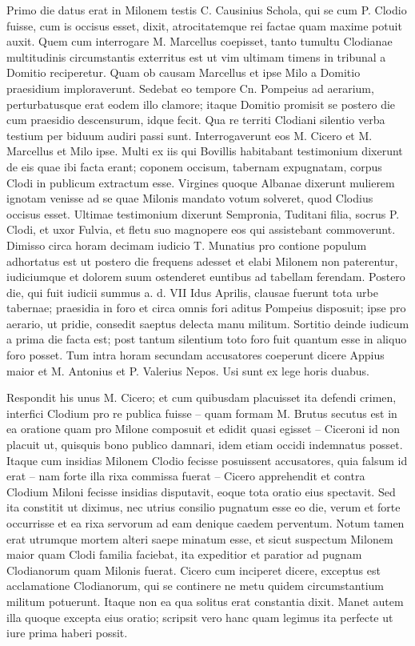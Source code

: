 Primo die datus erat in Milonem testis C. Causinius Schola, qui se cum P. Clodio fuisse, cum is occisus esset, dixit, atrocitatemque rei factae quam maxime potuit auxit. Quem cum interrogare M. Marcellus coepisset, tanto tumultu Clodianae multitudinis circumstantis exterritus est ut vim ultimam timens in tribunal a Domitio reciperetur. Quam ob causam Marcellus et ipse Milo a Domitio praesidium imploraverunt. Sedebat eo tempore Cn. Pompeius ad aerarium, perturbatusque erat eodem illo clamore; itaque Domitio promisit se postero die cum praesidio descensurum, idque fecit. Qua re territi Clodiani silentio verba testium per biduum audiri passi sunt. Interrogaverunt eos M. Cicero et M. Marcellus et Milo ipse. Multi ex iis qui Bovillis habitabant testimonium dixerunt de eis quae ibi facta erant; coponem occisum, tabernam expugnatam, corpus Clodi in publicum extractum esse. Virgines quoque Albanae dixerunt mulierem ignotam venisse ad se quae Milonis mandato votum solveret, quod Clodius occisus esset. Ultimae testimonium dixerunt Sempronia, Tuditani filia, socrus P. Clodi, et uxor Fulvia, et fletu suo magnopere eos qui assistebant commoverunt. Dimisso circa horam decimam iudicio T. Munatius pro contione populum adhortatus est ut postero die frequens adesset et elabi Milonem non paterentur, iudiciumque et dolorem suum ostenderet euntibus ad tabellam ferendam. Postero die, qui fuit iudicii summus a. d. VII Idus Aprilis, clausae fuerunt tota urbe tabernae; praesidia in foro et circa omnis fori aditus Pompeius disposuit; ipse pro aerario, ut pridie, consedit saeptus delecta manu militum. Sortitio deinde iudicum a prima die facta est; post tantum silentium toto foro fuit quantum esse in aliquo foro posset. Tum intra horam secundam accusatores coeperunt dicere Appius maior et M. Antonius et P. Valerius Nepos. Usi sunt ex lege horis duabus.

Respondit his unus M. Cicero; et cum quibusdam placuisset ita defendi crimen, interfici Clodium pro re publica fuisse – quam formam M. Brutus secutus est in ea oratione quam pro Milone composuit et edidit quasi egisset – Ciceroni id non placuit ut, quisquis bono publico damnari, idem etiam occidi indemnatus posset. Itaque cum insidias Milonem Clodio fecisse posuissent accusatores, quia falsum id erat – nam forte illa rixa commissa fuerat – Cicero apprehendit et contra Clodium Miloni fecisse insidias disputavit, eoque tota oratio eius spectavit. Sed ita constitit ut diximus, nec utrius consilio pugnatum esse eo die, verum et forte occurrisse et ea rixa servorum ad eam denique caedem perventum. Notum tamen erat utrumque mortem alteri saepe minatum esse, et sicut suspectum Milonem maior quam Clodi familia faciebat, ita expeditior et paratior ad pugnam Clodianorum quam Milonis fuerat. Cicero cum inciperet dicere, exceptus est acclamatione Clodianorum, qui se continere ne metu quidem circumstantium militum potuerunt. Itaque non ea qua solitus erat constantia dixit. Manet autem illa quoque excepta eius oratio; scripsit vero hanc quam legimus ita perfecte ut iure prima haberi possit.


